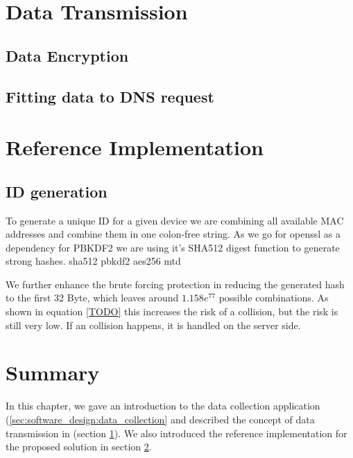 \section{Data Transmission}
\label{sec:software_design:tx}
%
    \subsection{Data Encryption}
        \label{subsec:software_design:encryption}

    \subsection{Fitting data to DNS request}
        \label{subsec:software_design:fitting}
\newpage


\section{Reference Implementation}
\label{sec:software_design:ref_impl}

%
\subsection{ID generation}
    To generate a unique ID for a given device we are combining all available MAC addresses and combine them in one colon-free string.  
    As we go for openssl as a dependency for PBKDF2 we are using it's SHA512 digest function to generate strong hashes.  
     sha512
     pbkdf2
     aes256
     mtd 
     
     We further enhance the brute forcing protection in reducing the generated hash to the first 32 Byte, which leaves around $1.158e^{77}$ possible combinations. 
     As shown in equation \ref{TODO} this increases the risk of a collision, but the risk is still very low. If an collision happens, it is handled on the server side.
\section{Summary}

In this chapter, we gave an introduction to the data collection application (\ref{sec:software_design:data_collection} and described the concept of data transmission in (section \ref{sec:software_design:tx}).
We also introduced the reference implementation for the proposed solution in section \ref{sec:software_design:ref_impl}. 
%